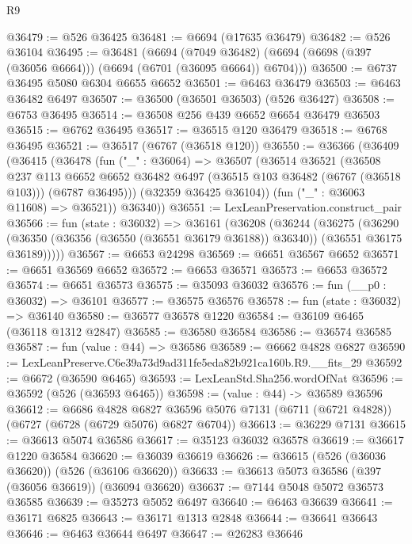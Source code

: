 \begin{lexlean}{R9}
\begin{coremodule}
@36479 := @526 @36425
@36481 := @6694 (@17635 @36479)
@36482 := @526 @36104
@36495 := @36481
    (@6694
      (@7049 @36482)
      (@6694 (@6698 (@397 (@36056 @6664))) (@6694 (@6701 (@36095 @6664)) @6704)))
@36500 := @6737 @36495 @5080 @6304 @6655 @6652
@36501 := @6463 @36479
@36503 := @6463 @36482 @6497
@36507 := @36500 (@36501 @36503) (@526 @36427)
@36508 := @6753 @36495
@36514 := @36508 @256 @439 @6652 @6654 @36479 @36503
@36515 := @6762 @36495
@36517 := @36515 @120 @36479
@36518 := @6768 @36495
@36521 := @36517 (@6767 (@36518 @120))
@36550 := @36366
    (@36409
      (@36415
        (@36478
          (fun ("_" : @36064) =>
          @36507
            (@36514
              @36521
              (@36508
                @237
                @113
                @6652
                @6652
                @36482
                @6497
                (@36515 @103 @36482 (@6767 (@36518 @103)))
                (@6787 @36495)))
            (@32359 @36425 @36104))
          (fun ("_" : @36063 @11608) => @36521))
        @36340))
@36551 := LexLeanPreservation.construct_pair
@36566 := fun (state : @36032) =>
  @36161
    (@36208
      (@36244
        (@36275
          (@36290
            (@36350 (@36356 (@36550 (@36551 @36179 @36188)) @36340))
            (@36551 @36175 @36189)))))
@36567 := @6653 @24298
@36569 := @6651 @36567 @6652
@36571 := @6651 @36569 @6652
@36572 := @6653 @36571
@36573 := @6653 @36572
@36574 := @6651 @36573
@36575 := @35093 @36032
@36576 := fun (__p0 : @36032) => @36101
@36577 := @36575 @36576
@36578 := fun (state : @36032) => @36140
@36580 := @36577 @36578 @1220
@36584 := @36109 @6465 (@36118 @1312 @2847)
@36585 := @36580 @36584
@36586 := @36574 @36585
@36587 := fun (value : @44) => @36586
@36589 := @6662 @4828 @6827
@36590 := LexLeanPreserve.C6e39a73d9ad311fe5eda82b921ca160b.R9.__fits_29
@36592 := @6672 (@36590 @6465)
@36593 := LexLeanStd.Sha256.wordOfNat
@36596 := @36592 (@526 (@36593 @6465))
@36598 := (value : @44) -> @36589 @36596
@36612 := @6686
    @4828
    @6827
    @36596
    @5076
    @7131
    (@6711 (@6721 @4828))
    (@6727 (@6728 (@6729 @5076) @6827 @6704))
@36613 := @36229 @7131
@36615 := @36613 @5074 @36586
@36617 := @35123 @36032 @36578
@36619 := @36617 @1220 @36584
@36620 := @36039 @36619
@36626 := @36615 (@526 (@36036 @36620)) (@526 (@36106 @36620))
@36633 := @36613 @5073 @36586 (@397 (@36056 @36619)) (@36094 @36620)
@36637 := @7144 @5048 @5072 @36573 @36585
@36639 := @35273 @5052 @6497
@36640 := @6463 @36639
@36641 := @36171 @6825
@36643 := @36171 @1313 @2848
@36644 := @36641 @36643
@36646 := @6463 @36644 @6497
@36647 := @26283 @36646

\end{coremodule}
\end{lexlean}
